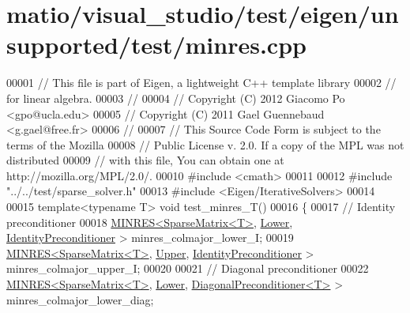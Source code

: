 \hypertarget{matio_2visual__studio_2test_2eigen_2unsupported_2test_2minres_8cpp_source}{}\section{matio/visual\+\_\+studio/test/eigen/unsupported/test/minres.cpp}
\label{matio_2visual__studio_2test_2eigen_2unsupported_2test_2minres_8cpp_source}

\begin{DoxyCode}
00001 \textcolor{comment}{// This file is part of Eigen, a lightweight C++ template library}
00002 \textcolor{comment}{// for linear algebra.}
00003 \textcolor{comment}{//}
00004 \textcolor{comment}{// Copyright (C) 2012 Giacomo Po <gpo@ucla.edu>}
00005 \textcolor{comment}{// Copyright (C) 2011 Gael Guennebaud <g.gael@free.fr>}
00006 \textcolor{comment}{//}
00007 \textcolor{comment}{// This Source Code Form is subject to the terms of the Mozilla}
00008 \textcolor{comment}{// Public License v. 2.0. If a copy of the MPL was not distributed}
00009 \textcolor{comment}{// with this file, You can obtain one at http://mozilla.org/MPL/2.0/.}
00010 \textcolor{preprocessor}{#include <cmath>}
00011 
00012 \textcolor{preprocessor}{#include "../../test/sparse\_solver.h"}
00013 \textcolor{preprocessor}{#include <Eigen/IterativeSolvers>}
00014 
00015 \textcolor{keyword}{template}<\textcolor{keyword}{typename} T> \textcolor{keywordtype}{void} test\_minres\_T()
00016 \{
00017   \textcolor{comment}{// Identity preconditioner}
00018   \hyperlink{group___iterative_linear_solvers___module_class_eigen_1_1_m_i_n_r_e_s}{MINRES<SparseMatrix<T>}, \hyperlink{group__enums_gga39e3366ff5554d731e7dc8bb642f83cda891792b8ed394f7607ab16dd716f60e6}{Lower}, 
      \hyperlink{group___iterative_linear_solvers___module_class_eigen_1_1_identity_preconditioner}{IdentityPreconditioner}    > minres\_colmajor\_lower\_I;
00019   \hyperlink{group___iterative_linear_solvers___module_class_eigen_1_1_m_i_n_r_e_s}{MINRES<SparseMatrix<T>}, \hyperlink{group__enums_gga39e3366ff5554d731e7dc8bb642f83cda6bcb58be3b8b8ec84859ce0c5ac0aaec}{Upper}, 
      \hyperlink{group___iterative_linear_solvers___module_class_eigen_1_1_identity_preconditioner}{IdentityPreconditioner}    > minres\_colmajor\_upper\_I;
00020 
00021   \textcolor{comment}{// Diagonal preconditioner}
00022   \hyperlink{group___iterative_linear_solvers___module_class_eigen_1_1_m_i_n_r_e_s}{MINRES<SparseMatrix<T>}, \hyperlink{group__enums_gga39e3366ff5554d731e7dc8bb642f83cda891792b8ed394f7607ab16dd716f60e6}{Lower}, 
      \hyperlink{group___iterative_linear_solvers___module_class_eigen_1_1_diagonal_preconditioner}{DiagonalPreconditioner<T>} > minres\_colmajor\_lower\_diag;

\end{DoxyCode}
